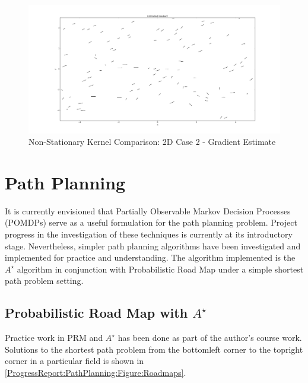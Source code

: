 				\begin{figure}[!htbp]
					\centering
						\includegraphics[width=\textwidth]{Figures/Progress/figure_2Dcase2_6.png}
					\caption{Non-Stationary Kernel Comparison: 2D Case 2 - Gradient Estimate}
					\label{ProgressReport:GaussianProcessModels:Figure:figure_2Dcase2_6}
				\end{figure}
						
				\FloatBarrier
														
	\section{Path Planning}
	\label{ProgressReport:PathPlanning}
	
		It is currently envisioned that Partially Observable Markov Decision Processes (POMDPs) serve as a useful formulation for the path planning problem. Project progress in the investigation of these techniques is currently at its introductory stage. Nevertheless, simpler path planning algorithms have been investigated and implemented for practice and understanding. The algorithm implemented is the $A^{\star}$ algorithm in conjunction with Probabilistic Road Map under a simple shortest path problem setting.
			
		\subsection{Probabilistic Road Map with $A^{\star}$}
		
			Practice work in PRM and $A^{\star}$ has been done as part of the author's course work. Solutions to the shortest path problem from the bottomleft corner to the topright corner in a particular field is shown in \cref{ProgressReport:PathPlanning:Figure:Roadmaps}.
			
